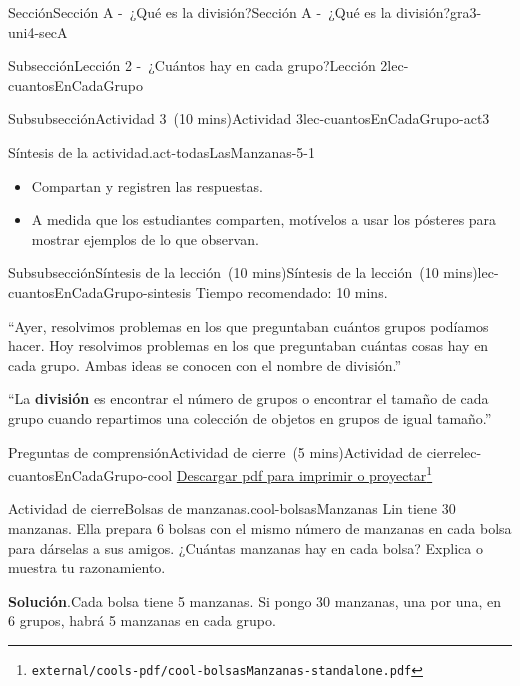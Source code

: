\documentclass[oneside,10pt,]{article}
\newcommand{\blocktitlefont}{\relax}
\newcommand{\terminology}[1]{\textbf{#1}}
\begin{document}
\begin{sectionptx}{Sección}{Sección A -~¿Qué es la división?}{}{Sección A -~¿Qué es la división?}{}{}{gra3-uni4-secA}
\begin{subsectionptx}{Subsección}{Lección 2 -~¿Cuántos hay en cada grupo?}{}{Lección 2}{}{}{lec-cuantosEnCadaGrupo}
\begin{subsubsectionptx}{Subsubsección}{Actividad 3~(10 mins)}{}{Actividad 3}{}{}{lec-cuantosEnCadaGrupo-act3}
\begin{paragraphs}{Síntesis de la actividad.}{act-todasLasManzanas-5-1}
\begin{itemize}[label=\textbullet]
\item{}Compartan y registren las respuestas.%
\item{}A medida que los estudiantes comparten, motívelos a usar los pósteres para mostrar ejemplos de lo que observan.%
\end{itemize}
\end{paragraphs}%
\end{subsubsectionptx}
%
%
\typeout{************************************************}
\typeout{************************************************}
%
\begin{subsubsectionptx}{Subsubsección}{Síntesis de la lección~(10 mins)}{}{Síntesis de la lección~(10 mins)}{}{}{lec-cuantosEnCadaGrupo-sintesis}
Tiempo recomendado: 10 mins.%
\par
``Ayer, resolvimos problemas en los que preguntaban cuántos grupos podíamos hacer. Hoy resolvimos problemas en los que preguntaban cuántas cosas hay en cada grupo. Ambas ideas se conocen con el nombre de división.''%
\par
``La \terminology{división} es encontrar el número de grupos o encontrar el tamaño de cada grupo cuando repartimos una colección de objetos en grupos de igual tamaño.''%
\end{subsubsectionptx}
%
%
\typeout{************************************************}
\typeout{************************************************}
%
\begin{reading-questions-subsubsection}{Preguntas de comprensión}{Actividad de cierre~(5 mins)}{}{Actividad de cierre}{}{}{lec-cuantosEnCadaGrupo-cool}
\href{external/cools-pdf/cool-bolsasManzanas-standalone.pdf}{Descargar pdf para imprimir o proyectar}\footnote{\nolinkurl{external/cools-pdf/cool-bolsasManzanas-standalone.pdf}\label{lec-cuantosEnCadaGrupo-cool-5}}\begin{project}{Actividad de cierre}{Bolsas de manzanas.}{cool-bolsasManzanas}%
Lin tiene 30 manzanas. Ella prepara 6 bolsas con el mismo número de manzanas en cada bolsa para dárselas a sus amigos. ¿Cuántas manzanas hay en cada bolsa? Explica o muestra tu razonamiento.%
\par\smallskip%
\noindent\textbf{\blocktitlefont Solución}.\hypertarget{cool-bolsasManzanas-3}{}\quad{}Cada bolsa tiene 5 manzanas. Si pongo 30 manzanas, una por una, en 6 grupos, habrá 5 manzanas en cada grupo.%
\begin{image}{0.15}{0.7}{0.15}{}%

\end{image}
\end{project}
\end{reading-questions-subsubsection}
\end{subsectionptx}
\end{sectionptx}
\end{document}
